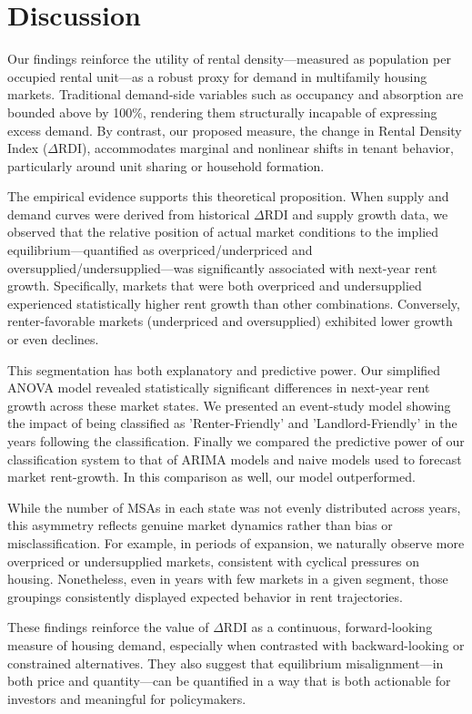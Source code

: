 \documentclass[APA,Times1COL]{WileyNJDv5} %
\begin{document}
\section{Discussion}

Our findings reinforce the utility of rental density---measured as population per occupied rental unit---as a robust proxy for demand in multifamily housing markets. Traditional demand-side variables such as occupancy and absorption are bounded above by 100\%, rendering them structurally incapable of expressing excess demand. By contrast, our proposed measure, the change in Rental Density Index (\(\Delta\text{RDI}\)), accommodates marginal and nonlinear shifts in tenant behavior, particularly around unit sharing or household formation.

The empirical evidence supports this theoretical proposition. When supply and demand curves were derived from historical \(\Delta\text{RDI}\) and supply growth data, we observed that the relative position of actual market conditions to the implied equilibrium---quantified as overpriced/underpriced and oversupplied/undersupplied---was significantly associated with next-year rent growth. Specifically, markets that were both overpriced and undersupplied experienced statistically higher rent growth than other combinations. Conversely, renter-favorable markets (underpriced and oversupplied) exhibited lower growth or even declines. 

This segmentation has both explanatory and predictive power. Our simplified ANOVA model revealed statistically significant differences in next-year rent growth across these market states. We presented an event-study model showing the impact of being classified as 'Renter-Friendly' and 'Landlord-Friendly' in the years following the classification. Finally we compared the predictive power of our classification system to that of ARIMA models and naive models used to forecast market rent-growth. In this comparison as well, our model outperformed. 

While the number of MSAs in each state was not evenly distributed across years, this asymmetry reflects genuine market dynamics rather than bias or misclassification. For example, in periods of expansion, we naturally observe more overpriced or undersupplied markets, consistent with cyclical pressures on housing. Nonetheless, even in years with few markets in a given segment, those groupings consistently displayed expected behavior in rent trajectories.

These findings reinforce the value of \(\Delta\text{RDI}\) as a continuous, forward-looking measure of housing demand, especially when contrasted with backward-looking or constrained alternatives. They also suggest that equilibrium misalignment---in both price and quantity---can be quantified in a way that is both actionable for investors and meaningful for policymakers.
\end{document}
